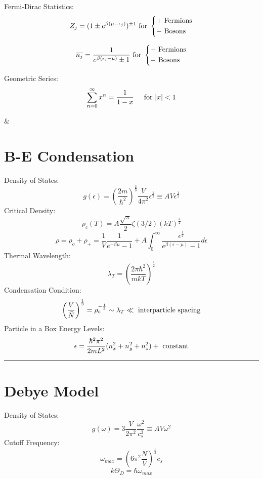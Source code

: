 \documentclass[table,cmyk]{article}
\begin{document}
\begin{longtable}
Fermi-Dirac Statistics:
\[Z_{j} = (1\pm e^{\beta(\mu - \epsilon_{j})})^{\pm1} \textmd{ for }
\begin{dcases}
	+ \textmd{ Fermions}\\
	- \textmd{ Bosons}
\end{dcases}
\]

\[ \overline{n_{j}} = \frac{1}{e^{\beta(\epsilon_{j} - \mu)} \pm 1} \textmd{ for }
\begin{dcases}
	+ \textmd{ Fermions}\\
	- \textmd{ Bosons}
\end{dcases}\]

Geometric Series:
\[\sum_{n=0}^{\infty} x^n = \frac{1}{1-x} \textmd{\hspace{0.5cm}for } |x| < 1\]

&
\section*{B-E Condensation}
Density of States:
\[g(\epsilon) = \left(\frac{2m}{\hbar^2}\right)^{\frac{2}{3}} \frac{V}{4\pi^2}\epsilon^{\frac{1}{2}} \equiv AV \epsilon^{\frac{1}{2}}\]
Critical Density:
\[\rho_{c}(T) = A \frac{\sqrt{\pi}}{2} \zeta(3/2)(kT)^{\frac{3}{2}}\]
\[\rho = \rho_{o} + \rho_{+} = \frac{1}{V} \frac{1}{e^{-\beta \mu} -1} + A \int_{0}^{\infty}\frac{\epsilon^{\frac{1}{2}}}{e^{\beta(\epsilon-\mu)}-1}d\epsilon\]
Thermal Wavelength:
\[\lambda_{T} = \left(\frac{2\pi\hbar^2}{mkT}\right)^{\frac{1}{2}}\]
Condensation Condition:
\[\left(\frac{V}{\bar{N}}\right)^{\frac{1}{3}} = \rho_{c}^{-\frac{1}{3}} \sim \lambda_{T} \ll \textmd{ interparticle spacing}\]
Particle in a Box Energy Levels:
\[\epsilon = \frac{\hbar^2\pi^2}{2mL^2}(n_{x}^2+n_{y}^2+n_{z}^2)+\textmd{ constant}\]
\noindent\rule{7.8cm}{0.4pt}
\section*{Debye Model}
Density of States:
\[g(\omega) = 3 \frac{V}{2\pi^2}\frac{\omega^2}{c_{s}^3} \equiv AV\omega^2\]
Cutoff Frequency:
\[\omega_{max} = \left(6\pi^2\frac{N}{V}\right)^{\frac{1}{3}}c_{s}\]
\[k\Theta_{D} = \hbar \omega_{max}\]

\tabularnewline\hline
\end{longtable}
\end{document}
